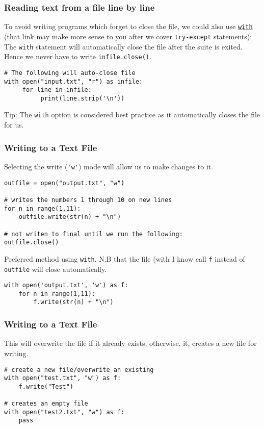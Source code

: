 \documentclass[xcolor=svgnames]{beamer}
\newcommand{\nl}{\\[1em]}
\newcommand{\ft}[1]{\frametitle{#1}}
\begin{document}
\begin{frame}[fragile]\ft{Reading text from a file line by line}
To avoid writing programs which forget to close the file, we could also use \href{https://effbot.org/zone/python-with-statement.htm}{\tt with} (that link may make more sense to you after we cover {\tt try-except} statements):\nl

The {\tt with} statement will automatically close the file after the suite is exited.  Hence we never have to write {\tt infile.close()}.
\begin{Verbatim}[xleftmargin=.5in, frame=single]
# The following will auto-close file
with open("input.txt", "r") as infile:
     for line in infile:
          print(line.strip('\n'))
\end{Verbatim}
\begin{block}{Tip:}
The {\tt with} option is considered best practice as it automatically closes the file for us.
\end{block}

\end{frame}





\begin{frame}[fragile]\ft{Writing to a Text File}
Selecting the write (\verb|'w'|) mode will allow us to make changes to it.
\begin{Verbatim}[xleftmargin=.5in, frame=single]
outfile = open("output.txt", "w")

# writes the numbers 1 through 10 on new lines
for n in range(1,11):
    outfile.write(str(n) + "\n")

# not writen to final until we run the following:
outfile.close() 
\end{Verbatim}
Preferred method using {\tt with}. N.B that the file (with I know call {\tt f} instead of {\tt outfile} will close automatically.
\begin{Verbatim}[xleftmargin=.5in, frame=single]
with open('output.txt', 'w') as f:
    for n in range(1,11):
        f.write(str(n) + "\n")
\end{Verbatim}
\end{frame}



\begin{frame}[fragile]\ft{Writing to a Text File}
 This will overwrite the file if it already exists, otherwise, it, creates a new file for writing.
\begin{Verbatim}[xleftmargin=.5in, frame=single]
# create a new file/overwrite an existing
with open("test.txt", "w") as f:
	f.write("Test")

# creates an empty file
with open("test2.txt", "w") as f:
	pass
\end{Verbatim}
\end{frame}
\end{document}

